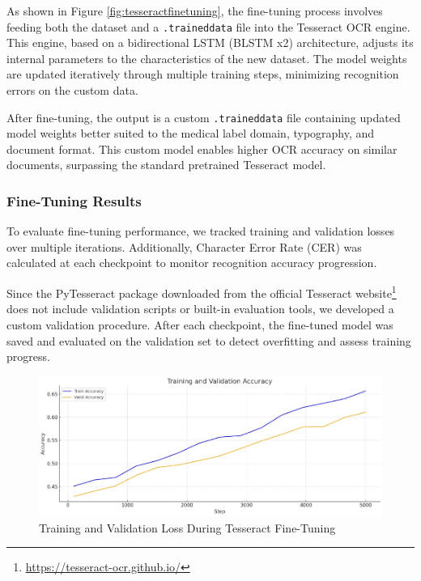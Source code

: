 As shown in Figure \ref{fig:tesseractfinetuning}, the fine-tuning process involves feeding both the dataset and a \texttt{.traineddata} file into the Tesseract OCR engine. This engine, based on a bidirectional LSTM (BLSTM x2) architecture, adjusts its internal parameters to the characteristics of the new dataset. The model weights are updated iteratively through multiple training steps, minimizing recognition errors on the custom data.

After fine-tuning, the output is a custom \texttt{.traineddata} file containing updated model weights better suited to the medical label domain, typography, and document format. This custom model enables higher OCR accuracy on similar documents, surpassing the standard pretrained Tesseract model.

\subsubsection*{Fine-Tuning Results}

To evaluate fine-tuning performance, we tracked training and validation losses over multiple iterations. Additionally, Character Error Rate (CER) was calculated at each checkpoint to monitor recognition accuracy progression.

Since the PyTesseract package downloaded from the official Tesseract website\footnote{\url{https://tesseract-ocr.github.io/}} does not include validation scripts or built-in evaluation tools, we developed a custom validation procedure. After each checkpoint, the fine-tuned model was saved and evaluated on the validation set to detect overfitting and assess training progress.

\vspace{0.5cm}

\begin{figure}[H]
\centering
\includegraphics[width=0.90\linewidth]{Figures/Chapter 3/Tessearct_validation_training.jpg}
\caption{Training and Validation Loss During Tesseract Fine-Tuning}
\label{fig:tesseract-loss-curve}
\end{figure}

